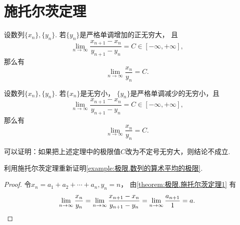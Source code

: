 \section{施托尔茨定理}
\begin{theorem}[施托尔茨定理I]\label{theorem:极限.施托尔茨定理1}
设数列\(\{x_n\},\{y_n\}\).
若\(\{y_n\}\)是严格单调增加的正无穷大，
且\[
	\lim_{n\to\infty} \frac{x_{n+1}-x_n}{y_{n+1}-y_n}
	= C
	\in[-\infty,+\infty],
\]
那么有\[
	\lim_{n\to\infty} \frac{x_n}{y_n}
	= C.
\]
\end{theorem}

\begin{theorem}[施托尔茨定理II]\label{theorem:极限.施托尔茨定理2}
设数列\(\{x_n\},\{y_n\}\).
若\(\{x_n\}\)是无穷小，
\(\{y_n\}\)是严格单调减少的无穷小，且\[
	\lim_{n\to\infty} \frac{x_{n+1}-x_n}{y_{n+1}-y_n}
	= C
	\in[-\infty,+\infty],
\]
那么有\[
	\lim_{n\to\infty} \frac{x_n}{y_n}
	= C.
\]
\end{theorem}

\begin{remark}
可以证明：如果把上述定理中的极限值\(C\)改为不定号无穷大，则结论不成立.
\end{remark}

\begin{example}
利用施托尔茨定理重新证明\cref{example:极限.数列的算术平均的极限}.
\begin{proof}
令\(x_n=a_1+a_2+\dotsb+a_n,y_n=n\)，
由\cref{theorem:极限.施托尔茨定理1} 有\[
	\lim_{n\to\infty} \frac{x_n}{y_n}
	= \lim_{n\to\infty} \frac{x_{n+1}-x_n}{y_{n+1}-y_n}
	= \lim_{n\to\infty} \frac{a_{n+1}}{1}
	= a.
	\qedhere
\]
\end{proof}
\end{example}

